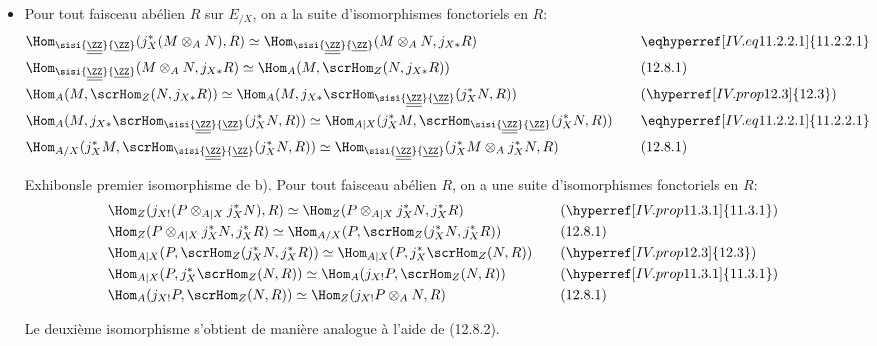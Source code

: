 \documentclass[10pt]{../fichiers-configuration-latex/smfart}
\begin{document}
\begin{itemize}
\item[Démontrons a).] Pour tout faisceau abélien $R$ sur $E_{/X}$, on
a la suite d'isomorphismes fonctoriels en $R$:
\begin{alignat*}{2}
&\Hom_{\sisi{\underline{\underline{\ZZ}}}{\underline{\ZZ}}}(j^{\ast}_X(M\otimes_A N),R)\simeq \Hom_{\sisi{\underline{\underline{\ZZ}}}{\underline{\ZZ}}} (M\otimes_A N,
j_{X\ast}R) &\quad& \eqhyperref[IV.eq11.2.2.1]{11.2.2.1}\\
&\Hom_{\sisi{\underline{\underline{\ZZ}}}{\underline{\ZZ}}}(M\otimes_A N, j_{X\ast}R)\simeq \Hom_A(M, \scrHom_Z(N,
j_{X\ast}R)) && (12.8.1)\\
&\Hom_A (M, \scrHom_Z(N, j_{X\ast}R))\simeq
\Hom_A(M,j_{X\ast}\scrHom_{\sisi{\underline{\underline{\ZZ}}}{\underline{\ZZ}}}(j^{\ast}_XN,R)) && (\hyperref[IV.prop12.3]{12.3})\\
& \Hom_A(M, j_{X\ast}\scrHom_{\sisi{\underline{\underline{\ZZ}}}{\underline{\ZZ}}}(j^{\ast}_XN,R))\simeq \Hom_{A|
X}(j^{\ast}_XM, \scrHom_{\sisi{\underline{\underline{\ZZ}}}{\underline{\ZZ}}} (j^{\ast}_XN,R)) && \eqhyperref[IV.eq11.2.2.1]{11.2.2.1}\\
&\Hom_{A/X}(j^{\ast}_XM, \scrHom_{\sisi{\underline{\underline{\ZZ}}}{\underline{\ZZ}}} (j^{\ast}_XN,R))\simeq \Hom_{\sisi{\underline{\underline{\ZZ}}}{\underline{\ZZ}}}
(j^{\ast}_XM\otimes_A j^{\ast}_X N,R) && (12.8.1)
\end{alignat*}

Exhibons\pageoriginale le premier isomorphisme de b). Pour tout
faisceau abélien $R$, on a une suite d'isomorphismes fonctoriels en
$R$:
\begin{alignat*}{2}
& \Hom_Z(j_{X!}(P\otimes_{A| X}j^{\ast}_XN),R)\simeq
\Hom_Z(P\otimes_{A| X} j^{\ast}_X N, j^{\ast}_X R) &\quad&
(\hyperref[IV.prop11.3.1]{11.3.1})\\
& \Hom_Z(P\otimes_{A| X}j^{\ast}_XN, j^{\ast}_XR)\simeq
\Hom_{A/X}(P,\scrHom_Z(j^{\ast}_XN, j^{\ast}_XR)) && (12.8.1)\\
&\Hom_{A| X}(P,\scrHom_Z (j^{\ast}_XN, j^{\ast}_XR))\simeq
\Hom_{A| X}(P, j^{\ast}_X\scrHom_Z (N,R)) && (\hyperref[IV.prop12.3]{12.3})\\
&\Hom_{A| X}(P, j^{\ast}_X\scrHom_Z(N,R))\simeq \Hom_A (j_{X!}P,
\scrHom_Z (N,R)) && (\hyperref[IV.prop11.3.1]{11.3.1})\\
&\Hom_A (j_{X!}P, \scrHom_Z(N,R))\simeq \Hom_Z (j_{X!}P\otimes_A
N,R) && (12.8.1)
\end{alignat*}

Le deuxième isomorphisme s'obtient de manière analogue à l'aide de
(12.8.2).
\end{itemize}
\end{document}
